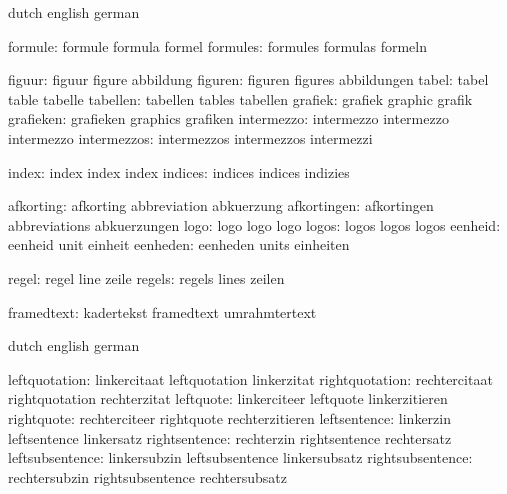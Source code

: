 
\startvariables       dutch                english             german

            formule:  formule              formula             formel
           formules:  formules             formulas            formeln

             figuur:  figuur               figure              abbildung
            figuren:  figuren              figures             abbildungen
              tabel:  tabel                table               tabelle
           tabellen:  tabellen             tables              tabellen
            grafiek:  grafiek              graphic             grafik
          grafieken:  grafieken            graphics            grafiken
         intermezzo:  intermezzo           intermezzo          intermezzo
        intermezzos:  intermezzos          intermezzos         intermezzi

              index:  index                index               index
            indices:  indices              indices             indizies

          afkorting:  afkorting            abbreviation        abkuerzung
        afkortingen:  afkortingen          abbreviations       abkuerzungen
               logo:  logo                 logo                logo
              logos:  logos                logos               logos
            eenheid:  eenheid              unit                einheit
           eenheden:  eenheden             units               einheiten

              regel:  regel                line                zeile
             regels:  regels               lines               zeilen

         framedtext:  kadertekst           framedtext          umrahmtertext

\stopvariables




\startconstants       dutch                english             german

      leftquotation:  linkercitaat         leftquotation       linkerzitat
     rightquotation:  rechtercitaat        rightquotation      rechterzitat
          leftquote:  linkerciteer         leftquote           linkerzitieren
         rightquote:  rechterciteer        rightquote          rechterzitieren
       leftsentence:  linkerzin            leftsentence        linkersatz
      rightsentence:  rechterzin           rightsentence       rechtersatz
    leftsubsentence:  linkersubzin         leftsubsentence     linkersubsatz
   rightsubsentence:  rechtersubzin        rightsubsentence    rechtersubsatz

